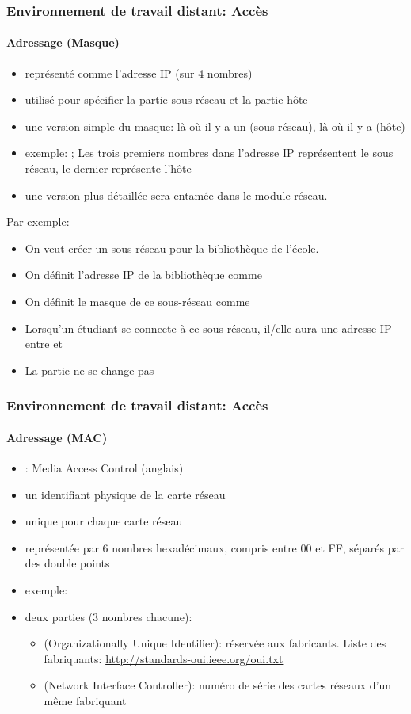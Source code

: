 \documentclass[xcolor=table]{beamer}
\begin{document}
\begin{frame}
\frametitle{Environnement de travail distant: Accès}
\framesubtitle{Adressage (Masque)}

\begin{itemize}
	\item représenté comme l'adresse IP (sur 4 nombres)
	\item utilisé pour spécifier la partie sous-réseau et la partie hôte
	\item une version simple du masque: là où il y a un  (sous réseau), là où il y a  (hôte)
	\item exemple: ; Les trois premiers nombres dans l'adresse IP représentent le sous réseau, le dernier représente l'hôte 
	\item une version plus détaillée sera entamée dans le module réseau.
\end{itemize}

Par exemple: 
\begin{itemize}
	\item On veut créer un sous réseau pour la bibliothèque de l'école. 
	\item On définit l'adresse IP de la bibliothèque comme 
	\item On définit le masque de ce sous-réseau comme 
	\item Lorsqu'un étudiant se connecte à ce sous-réseau, il/elle aura une adresse IP entre  et  
	\item La partie  ne se change pas 
\end{itemize}

\end{frame}

\begin{frame}
\frametitle{Environnement de travail distant: Accès}
\framesubtitle{Adressage (MAC)}

\begin{itemize}
	\item {}: Media Access Control (anglais)
	\item un identifiant physique de la carte réseau 
	\item unique pour chaque carte réseau  
	\item représentée par 6 nombres hexadécimaux, compris entre 00 et FF, séparés par des double points
	\item exemple: 
	\item deux parties (3 nombres chacune): 
	\begin{itemize}
		\item {} (Organizationally Unique Identifier): réservée aux fabricants. 
		Liste des fabriquants: \url{http://standards-oui.ieee.org/oui.txt}
		\item {} (Network Interface Controller): numéro de série des cartes réseaux d'un même fabriquant
	\end{itemize}
\end{itemize}

\end{frame}
\end{document}
